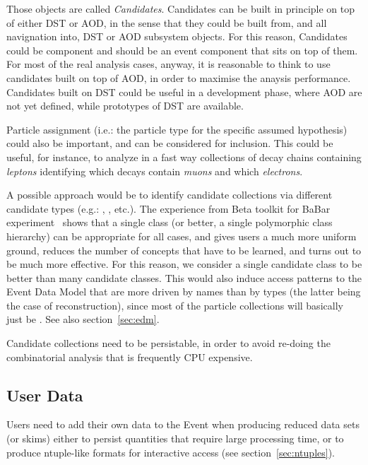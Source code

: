 \documentclass[draftmode]{memarticle}
\begin{document}
Those objects are called {\em Candidates}. Candidates 
can be built in principle on top of either DST or AOD, 
in the sense that they could be built from, and all navignation
into, DST or AOD subsystem objects. For this reason, 
Candidates could be component and should
be an event component that sits on top of them. For most
of the real analysis cases, anyway, it is reasonable to
think to use candidates built on top of AOD, in order
to maximise the anaysis performance. Candidates built
on DST could be useful in a development phase, where AOD
are not yet defined, while prototypes of DST are available.

Particle assignment (i.e.: the particle type for the 
specific assumed hypothesis) could also be important, and
can be considered for inclusion. This could be useful,
for instance, to analyze in a fast way collections of
decay chains containing {\em leptons} identifying which decays
contain {\em muons} and which {\em electrons}.


A possible approach would be to identify candidate
collections via different candidate types (e.g.: , 
, etc.). The experience from
Beta toolkit for BaBar experiment~\cite{Beta} shows
that a single class (or better, a single polymorphic
class hierarchy) can be appropriate for all cases,
and gives users a much more uniform ground, 
reduces the number of concepts that have to be
learned, and turns out to be much more effective.
For this reason, we consider a single candidate class to be better
than many candidate classes.
This would also induce access patterns to the
Event Data Model that are more driven by names
than by types (the latter being the case of reconstruction), 
since most of the particle collections
will basically just be .
See also section~\ref{sec:edm}.

Candidate collections need to be persistable, 
in order to avoid re-doing the combinatorial 
analysis that is frequently CPU expensive.

\subsection{User Data}
\label{sec:userdata}
Users need to add their own data to the Event when 
producing reduced data sets (or skims) either to 
persist quantities that require large processing time,
or to produce ntuple-like formats for interactive 
access (see section~\ref{sec:ntuples}).
\end{document}
